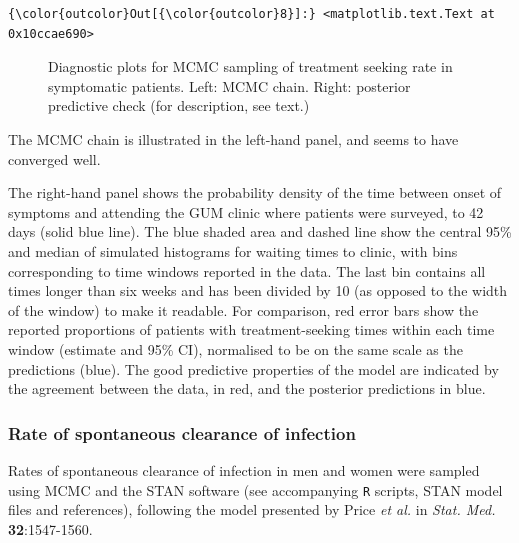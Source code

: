 \documentclass{article}
\begin{document}
    \begin{footnotesize}
            \begin{Verbatim}[commandchars=\\\{\}]
{\color{outcolor}Out[{\color{outcolor}8}]:} <matplotlib.text.Text at 0x10ccae690>
\end{Verbatim}
    \end{footnotesize}
        
    \begin{figure}
        \begin{center}\end{center}
        \caption{Diagnostic plots for MCMC sampling of treatment seeking rate in symptomatic patients. Left: MCMC chain. Right: posterior predictive check (for description, see text.)}
        \label{fig:trt_seek_diagnostic}
    \end{figure}
    
    The MCMC chain is illustrated in the left-hand panel, and seems to have
converged well.

The right-hand panel shows the probability density of the time between
onset of symptoms and attending the GUM clinic where patients were
surveyed, to 42 days (solid blue line). The blue shaded area and dashed
line show the central 95\% and median of simulated histograms for
waiting times to clinic, with bins corresponding to time windows
reported in the data. The last bin contains all times longer than six
weeks and has been divided by 10 (as opposed to the width of the window)
to make it readable. For comparison, red error bars show the reported
proportions of patients with treatment-seeking times within each time
window (estimate and 95\% CI), normalised to be on the same scale as the
predictions (blue). The good predictive properties of the model are
indicated by the agreement between the data, in red, and the posterior
predictions in blue.

    \subsubsection{Rate of spontaneous clearance of
infection}\label{rate-of-spontaneous-clearance-of-infection}

Rates of spontaneous clearance of infection in men and women were
sampled using MCMC and the STAN software (see accompanying \texttt{R}
scripts, STAN model files and references), following the model presented
by Price \emph{et al.} in \emph{Stat. Med.} \textbf{32}:1547-1560.
\end{document}
